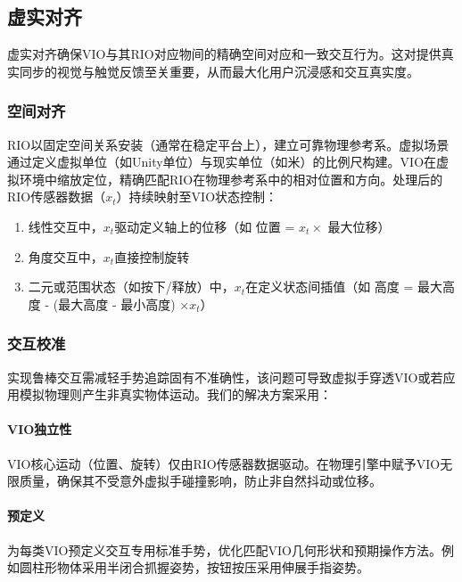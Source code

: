 \documentclass[runningheads]{llncs}
\begin{document}
\subsection{虚实对齐}
虚实对齐确保VIO与其RIO对应物间的精确空间对应和一致交互行为。这对提供真实同步的视觉与触觉反馈至关重要，从而最大化用户沉浸感和交互真实度。

\subsubsection{空间对齐}
RIO以固定空间关系安装（通常在稳定平台上），建立可靠物理参考系。虚拟场景通过定义虚拟单位（如Unity单位）与现实单位（如米）的比例尺构建。VIO在虚拟环境中缩放定位，精确匹配RIO在物理参考系中的相对位置和方向。处理后的RIO传感器数据（$x_t$）持续映射至VIO状态控制：
\begin{enumerate}
  \item 线性交互中，$x_t$驱动定义轴上的位移（如 位置 = $x_t \times$ 最大位移）
  \item 角度交互中，$x_t$直接控制旋转
  \item 二元或范围状态（如按下/释放）中，$x_t$在定义状态间插值（如 高度 = 最大高度 - (最大高度 - 最小高度) $\times x_t$）
\end{enumerate}

\subsubsection{交互校准}
实现鲁棒交互需减轻手势追踪固有不准确性，该问题可导致虚拟手穿透VIO或若应用模拟物理则产生非真实物体运动。我们的解决方案采用：

\paragraph{VIO独立性} VIO核心运动（位置、旋转）仅由RIO传感器数据驱动。在物理引擎中赋予VIO无限质量，确保其不受意外虚拟手碰撞影响，防止非自然抖动或位移。

\paragraph{预定义} 为每类VIO预定义交互专用标准手势，优化匹配VIO几何形状和预期操作方法。例如圆柱形物体采用半闭合抓握姿势，按钮按压采用伸展手指姿势。
\end{document}
